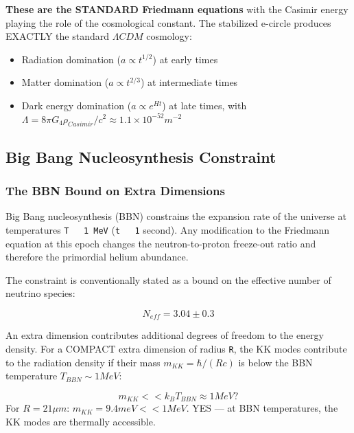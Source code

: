 \documentclass[aps,prd,preprint,superscriptaddress,longbibliography,floatfix]{revtex4-2}
\theoremstyle{remark}
\begin{document}
\textbf{These are the STANDARD Friedmann equations} with the Casimir energy playing the role of the cosmological constant. The stabilized e-circle produces EXACTLY the standard $\Lambda CDM$ cosmology:


\begin{itemize}
  \item Radiation domination ($a \propto t^{1/2}$) at early times
  \item Matter domination ($a \propto t^{2/3}$) at intermediate times
  \item Dark energy domination ($a \propto e^{Ht}$) at late times, with $\Lambda = 8\pi G_{4} \rho_{Casimir}/c^{2} \approx 1.1 \times 10^{-52} m^{-2}$
\end{itemize}



\subsection{Big Bang Nucleosynthesis Constraint}


\subsubsection{The BBN Bound on Extra Dimensions}

Big Bang nucleosynthesis (BBN) constrains the expansion rate of the universe at temperatures \texttt{T ~ 1 MeV} (\texttt{t ~ 1} second). Any modification to the Friedmann equation at this epoch changes the neutron-to-proton freeze-out ratio and therefore the primordial helium abundance.

The constraint is conventionally stated as a bound on the effective number of neutrino species:


\begin{equation}
    N_{eff} = 3.04 \pm 0.3
\end{equation}
\cite{Planck2018_VI}

An extra dimension contributes additional degrees of freedom to the energy density. For a COMPACT extra dimension of radius \texttt{R}, the KK modes contribute to the radiation density if their mass $m_{KK} = \hbar/(Rc)$ is below the BBN temperature $T_{BBN} \sim  1 MeV$:


\begin{equation}
    m_{KK} << k_B T_{BBN} \approx 1 MeV?
\end{equation}
For $R = 21 \mu m$: $m_{KK} = 9.4 meV << 1 MeV$. YES --- at BBN temperatures, the KK modes are thermally accessible.
\end{document}
